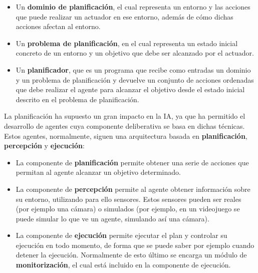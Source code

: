 \begin{itemize}[label=\textbullet]
    \item Un \textbf{dominio de planificación}, el cual representa un entorno y las acciones
    que puede realizar un actuador en ese entorno, además de cómo dichas acciones afectan
    al entorno.
    \item Un \textbf{problema de planificación}, en el cual representa un estado inicial
    concreto de un entorno y un objetivo que debe ser alcanzado por el actuador.
    \item Un \textbf{planificador}, que es un programa que recibe como entradas un dominio y un
    problema de planificación y devuelve un conjunto de acciones ordenadas que debe realizar
    el agente para alcanzar el objetivo desde el estado inicial descrito en el problema de
    planificación.
\end{itemize}

La planificación ha supuesto un gran impacto en la IA, ya que ha permitido el desarrollo
de agentes cuya componente deliberativa se basa en dichas técnicas. Estos agentes, normalmente,
siguen una arquitectura basada en \textbf{planificación}, \textbf{percepción} y \textbf{ejecución}:

\begin{itemize}
    \item La componente de \textbf{planificación} permite obtener una serie
    de acciones que permitan al agente alcanzar un objetivo determinado.
    \item La componente de \textbf{percepción} permite al agente obtener información sobre
    su entorno, utilizando para ello sensores. Estos sensores pueden ser reales (por ejemplo
    una cámara) o simulados (por ejemplo, en un videojuego se puede simular lo que
    ve un agente, simulando así una cámara).
    \item La componente de \textbf{ejecución} permite ejecutar el plan y controlar su ejecución
    en todo momento, de forma que se puede saber por ejemplo cuando detener la ejecución. Normalmente
    de esto último se encarga un módulo de \textbf{monitorización}, el cual está incluido en la componente
    de ejecución.
\end{itemize}

